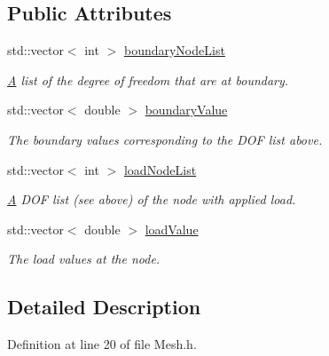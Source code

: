 \subsection*{Public Attributes}
\begin{DoxyCompactItemize}
\item 
std\+::vector$<$ int $>$ \mbox{\hyperlink{class_mesh_a5a1c5739ef85c8f9071f689e790b5251}{boundary\+Node\+List}}
\begin{DoxyCompactList}\small\item\em \mbox{\hyperlink{class_a}{A}} list of the degree of freedom that are at boundary. \end{DoxyCompactList}\item 
\mbox{\label{class_mesh_ab331f3e3efeb2934c202b07db8a6c1a5}} 
std\+::vector$<$ double $>$ \mbox{\hyperlink{class_mesh_ab331f3e3efeb2934c202b07db8a6c1a5}{boundary\+Value}}
\begin{DoxyCompactList}\small\item\em The boundary values corresponding to the D\+OF list above. \end{DoxyCompactList}\item 
\mbox{\label{class_mesh_ad54254084b97877bb4d0f9d9d9cbb380}} 
std\+::vector$<$ int $>$ \mbox{\hyperlink{class_mesh_ad54254084b97877bb4d0f9d9d9cbb380}{load\+Node\+List}}
\begin{DoxyCompactList}\small\item\em \mbox{\hyperlink{class_a}{A}} D\+OF list (see above) of the node with applied load. \end{DoxyCompactList}\item 
\mbox{\label{class_mesh_a688adb457f52ffa939f53f22afae697e}} 
std\+::vector$<$ double $>$ \mbox{\hyperlink{class_mesh_a688adb457f52ffa939f53f22afae697e}{load\+Value}}
\begin{DoxyCompactList}\small\item\em The load values at the node. \end{DoxyCompactList}\end{DoxyCompactItemize}


\subsection{Detailed Description}


Definition at line 20 of file Mesh.\+h.



